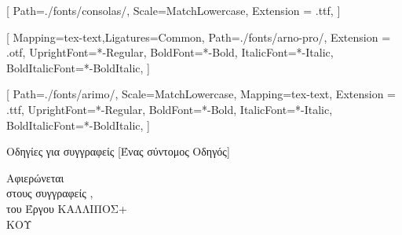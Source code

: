 \documentclass{kalliposstd}
\begin{document}

\setmonofont{Consolas}[
    Path=./fonts/consolas/,
    Scale=MatchLowercase,
    Extension = .ttf,
    ]

\setmainfont{ArnoPro}[
Mapping=tex-text,Ligatures=Common,
    Path=./fonts/arno-pro/,
    Extension = .otf,
    UprightFont=*-Regular,
    BoldFont=*-Bold,
    ItalicFont=*-Italic,
    BoldItalicFont=*-BoldItalic,
    ]

\setsansfont{Arimo}[
    Path=./fonts/arimo/,
    Scale=MatchLowercase,
    Mapping=tex-text,
    Extension = .ttf,
    UprightFont=*-Regular,
    BoldFont=*-Bold,
    ItalicFont=*-Italic,
    BoldItalicFont=*-BoldItalic,
    ]








\begin{authorpage}{Οδηγίες για συγγραφείς \XeLaTeX}[Ένας σύντομος Οδηγός]
\end{authorpage}
\begin{dedication}
Αφιερώνεται\\
στους συγγραφείς \XeLaTeX,\\
του Έργου ΚΑΛΛΙΠΟΣ+\\
ΚΟΥ
\end{dedication}
\end{document}
